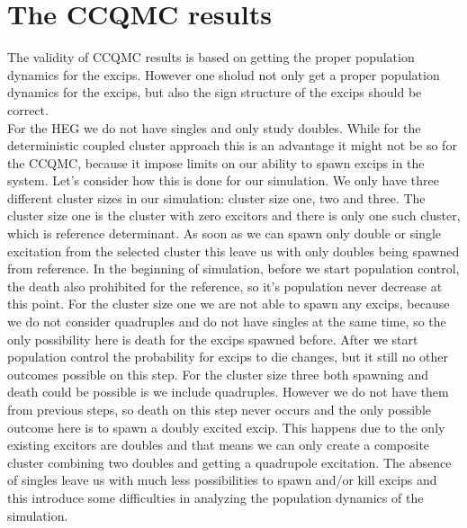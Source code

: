 \documentclass[twoside,english]{uiofysmaster}
\theoremstyle{definition}
\begin{document}
\section{The CCQMC results}
The validity of CCQMC results is based on getting the proper population dynamics for the excips. However one sholud not only get a proper population dynamics for the excips, but also the sign structure of the excips should be correct. \\
For the HEG we do not have singles and only study doubles. While for the deterministic coupled cluster approach this is an advantage it might not be so for the CCQMC, because it impose limits on our ability to spawn excips in the system. Let's consider how this is done for our simulation. We only have three different cluster sizes in our simulation: cluster size one, two and three. The cluster size one is the cluster with zero excitors and there is only one such cluster, which is reference determinant. As soon as we can spawn only double or single excitation from the selected cluster this leave us with only doubles being spawned from reference. In the beginning of simulation, before we start population control, the death also prohibited for the reference, so it's population never decrease at this point. For the cluster size one we are not able to spawn any excips, because we do not consider quadruples and do not have singles at the same time, so the only possibility here is death for the excips spawned before. After we start population control the probability for excips to die changes, but it still no other outcomes possible on this step. For the cluster size three both spawning and death could be possible is we include quadruples. However we do not have them from previous steps, so death on this step never occurs and the only possible outcome here is to spawn a doubly excited excip. This happens due to the only existing excitors are doubles and that means we can only create a composite cluster combining two doubles and getting a quadrupole excitation. The absence of singles leave us with much less possibilities to spawn and/or kill excips and this introduce some difficulties in analyzing the population dynamics of the simulation.\\
\end{document}
